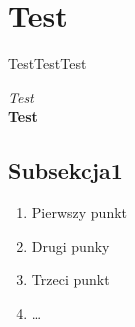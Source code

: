 \section{Test}

TestTestTest

\textit{Test} \\
\textbf{Test}


\subsection{Subsekcja1}

\begin{enumerate}
	\item Pierwszy punkt
	\item Drugi punky
	\item Trzeci punkt
	\item \ldots
\end{enumerate}
